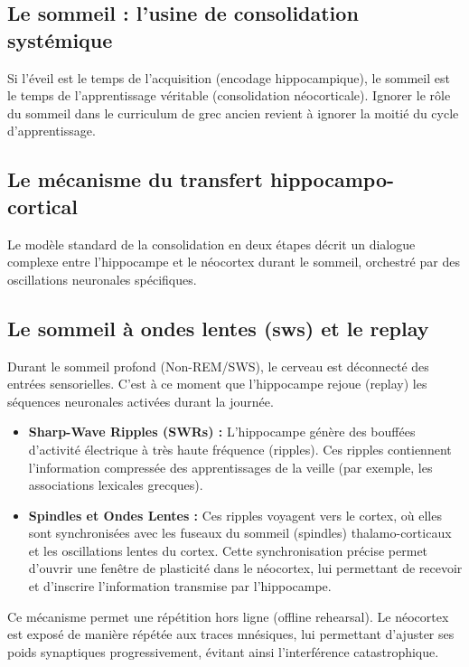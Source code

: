 \subsection{Le sommeil : l'usine de consolidation systémique}

Si l'éveil est le temps de l'acquisition (encodage hippocampique), le sommeil est le temps de
l'apprentissage véritable (consolidation néocorticale). Ignorer le rôle du sommeil dans le
curriculum de grec ancien revient à ignorer la moitié du cycle d'apprentissage.



\subsection{Le mécanisme du transfert hippocampo-cortical}

Le modèle standard de la consolidation en deux étapes décrit un dialogue complexe entre l'hippocampe
et le néocortex durant le sommeil, orchestré par des oscillations neuronales spécifiques.



\subsection{Le sommeil à ondes lentes (sws) et le replay}

Durant le sommeil profond (Non-REM/SWS), le cerveau est déconnecté des entrées sensorielles. C'est à
ce moment que l'hippocampe \og rejoue\fg{} (replay) les séquences neuronales activées durant la
journée.\cite{III-3-1-ref12}

\begin{itemize}\item \textbf{Sharp-Wave Ripples (SWRs) :} L'hippocampe génère des bouffées d'activité électrique à très haute fréquence (ripples). Ces ripples contiennent l'information compressée des apprentissages de la veille (par exemple, les associations lexicales grecques).\item \textbf{Spindles et Ondes Lentes :} Ces ripples voyagent vers le cortex, où elles sont synchronisées avec les fuseaux du sommeil (spindles) thalamo-corticaux et les oscillations lentes du cortex. Cette synchronisation précise permet d'ouvrir une fenêtre de plasticité dans le néocortex, lui permettant de recevoir et d'inscrire l'information transmise par l'hippocampe.\cite{III-3-1-ref12}\end{itemize}Ce mécanisme permet une \og répétition hors ligne\fg{} (offline rehearsal). Le néocortex est exposé
de manière répétée aux traces mnésiques, lui permettant d'ajuster ses poids synaptiques
progressivement, évitant ainsi l'interférence catastrophique.



